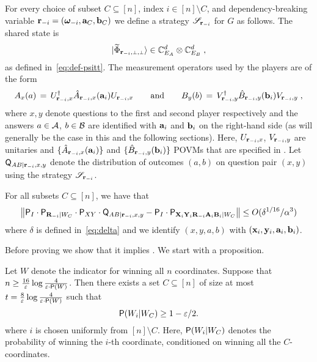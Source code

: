 For every choice of subset $C \subseteq [n]$, index  $i \in [n] \setminus C$, and dependency-breaking variable $\br_\mi = (\bomega_\mi,\ba_C,\bb_C)$ we define a  strategy $\strategy_{\br_\mi}$ for $G$ as follows. The shared state is 
\[\ket{\wt{\Phi}_\sspp} \in \C_{E_A}^d \otimes \C_{E_B}^d\;,\]
as defined in~\eqref{eq:def-psitt}. The measurement operators used by the players are of the form 
\[ A_x(a)\,=\,  U_{\br_\mi,x}^\dagger \what{A}_{\br_\mi,x}(\ba_i)U_{\br_\mi,x}\qquad\text{and}\qquad B_y(b) \,=\,V_{\br_\mi,y}^\dagger\what{B}_{\br_\mi, y}(\bb_i) V_{\br_\mi,y}\;,\]
where $x,y$ denote questions to the first and second player respectively and the answers $a\in \A$, $b\in \B$ are identified with $\ba_i$ and $\bb_i$ on the right-hand side (as will generally be the case in this and the following sections). 
Here, $U_{\br_\mi,x}$, $V_{\br_\mi,y}$ are unitaries and $\{\what{A}_{\br_\mi,x}(\ba_i) \}$ and $\{\what{B}_{\br_\mi, y}(\bb_i)\}$ POVMs that are specified in .
Let $\Qsf_{A B | \br_\mi, x,y}$ denote the distribution of outcomes $(a,b)$ on question pair $(x,y)$ using the strategy $\strategy_{\br_\mi}$. %

\begin{lemma}
\label{lem:anchorpr_main_lemma}
For all subsets $C \subseteq [n]$, we have that 
\[
	\big \| \P_I \cdot \P_{\bR_\mi | W_C} \cdot \P_{XY} \cdot \Qsf_{AB | \br_\mi, x,y} - \P_I \cdot \P_{\bX_i \bY_i \bR_\mi \bA_i \bB_i | W_C} \big \| \leq O(\delta^{1/16}/\alpha^3)
\]
where $\delta$ is defined in~\eqref{eq:delta} and we identify $(x,y,a,b)$ with $(\bx_i,\by_i,\ba_i,\bb_i)$. 
\end{lemma}

Before proving  we show that it implies . We start with a proposition.

\begin{proposition}
\label{prop:subset}
	Let $W$ denote the indicator for winning all $n$ coordinates. Suppose that $n \geq \frac{16}{\eps} \log \frac{4}{\eps \cdot \P(W)}$. Then there exists a set $C \subseteq [n]$ of size at most $t = \frac{8}{\eps} \log \frac{4}{\eps \cdot \P(W)}$ such that
	$$
		\P (W_i | W_C) \geq 1 - \eps/2.
	$$
	where $i$ is chosen uniformly from $[n] \setminus C$. Here, $\P(W_i | W_C)$ denotes the probability of winning the $i$-th coordinate, conditioned on winning all the $C$-coordinates.
\end{proposition}

